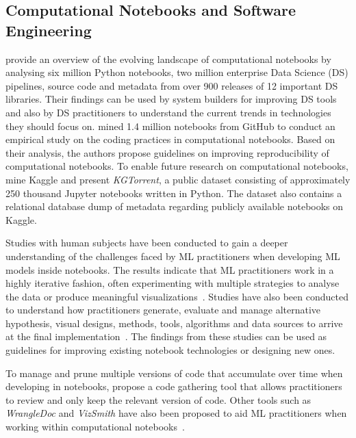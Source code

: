\documentclass[smallextended]{svjour3}       %
\begin{document}
\subsection{Computational Notebooks and Software Engineering}\label{sec:notebooks}

\citet{psallidas2019data} provide an overview of the evolving landscape of computational notebooks by analysing six million Python notebooks, two million enterprise Data Science (DS) pipelines, source code and metadata from over 900 releases of 12 important DS libraries. Their findings can be used by system builders for improving DS tools and also by DS practitioners to understand the current trends in technologies they should focus on. \citet{pimentel2019large-scale} mined 1.4 million notebooks from GitHub to conduct an empirical study on the coding practices in computational notebooks. Based on their analysis, the authors propose guidelines on improving reproducibility of computational notebooks. To enable future research on computational notebooks, \citet{quaranta2021kgtorrent} mine Kaggle and present \textit{KGTorrent}, a public dataset consisting of approximately 250 thousand Jupyter notebooks written in Python. The dataset also contains a relational database dump of metadata regarding publicly available notebooks on Kaggle.

Studies with human subjects have been conducted to gain a deeper understanding of the challenges faced by ML practitioners when developing ML models inside notebooks. The results indicate that ML practitioners work in a highly iterative fashion, often experimenting with multiple strategies to analyse the data or produce meaningful visualizations~\citep{kandel2012enterprise,kery2018story,liu2019understanding,chattopadhyay2020whats}. Studies have also been conducted to understand how practitioners generate, evaluate and manage alternative hypothesis, visual designs, methods, tools, algorithms and data sources to arrive at the final implementation~\citep{liu2019understanding,kandel2012enterprise}. The findings from these studies can be used as guidelines for improving existing notebook technologies or designing new ones.

To manage and prune multiple versions of code that accumulate over time when developing in notebooks, \citet{head2019managing} propose a code gathering tool that allows practitioners to review and only keep the relevant version of code. Other tools such as \textit{WrangleDoc} and \textit{VizSmith} have also been proposed to aid ML practitioners when working within computational notebooks~\citep{yang2021subtle,bavishi2021vizsmith}.
\end{document}
